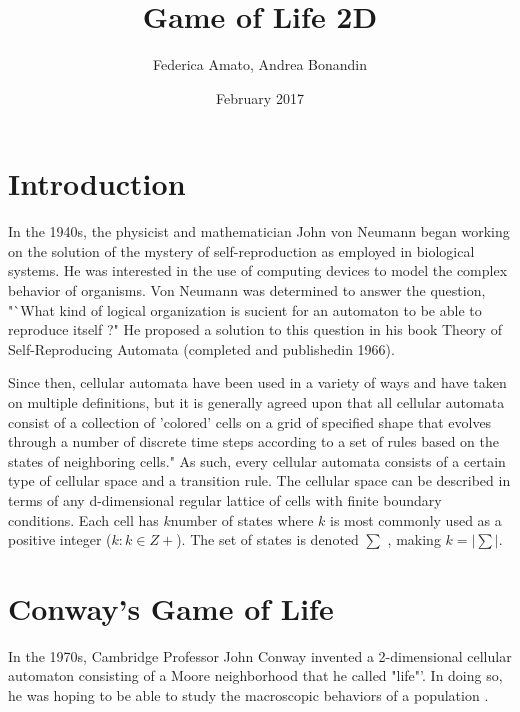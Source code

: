 \documentclass{report}%
\begin{document}
\title{Game of Life 2D}
\author{Federica Amato, Andrea Bonandin}
\date{February 2017}
\maketitle
\tableofcontents


\chapter{Introduction}
In the 1940s, the physicist and mathematician John von Neumann began working
on the solution of the mystery of self-reproduction as employed in biological systems. He was
interested in the use of computing devices to model the complex behavior of organisms.
Von Neumann was determined to answer the question, "`What kind of logical organization is sucient for
an automaton to be able to reproduce itself ?" He proposed a solution to this question in
his book Theory of Self-Reproducing Automata (completed and publishedin 1966).

\noindent Since then, cellular automata have been used in a variety of ways and have taken on multiple
definitions, but it is generally agreed upon that all cellular automata consist of a collection of
'colored' cells on a grid of specified shape that evolves through a number of discrete time steps
according to a set of rules based on the states of neighboring cells." As such, every cellular
automata consists of a certain type of cellular space and a transition rule. The cellular space can
be described in terms of any d-dimensional regular lattice of cells with finite boundary conditions.
Each cell has $k $number of states where $k$ is most commonly used as a positive integer ($k : k \in Z+$). The set of states is denoted $\sum$ , making $k = |\sum|$. 

\chapter{Conway's Game of Life}

In the 1970s, Cambridge Professor John Conway invented a 2-dimensional cellular automaton consisting of a Moore neighborhood that he called "life"'. In doing so, he was hoping to be able to study the macroscopic behaviors of a population . 
\end{document}
